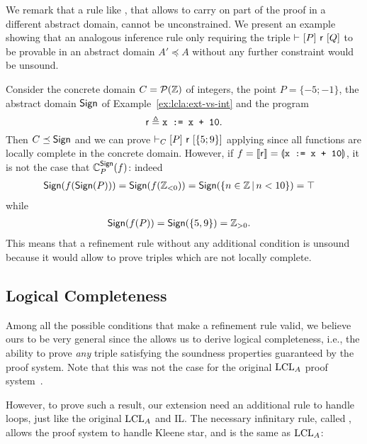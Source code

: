 We remark that a rule like , that allows to carry on part of the proof in a different abstract domain, cannot be unconstrained. We present an example showing that an analogous inference rule only requiring the triple $\vdash_{}\nobreak[P]~\mathsf{r}~[Q]$ to be provable in an abstract domain $A' \preceq A$ without any further constraint would be unsound.
\begin{example}
	Consider the concrete domain $C = \mathcal{P}(\mathbb{Z})$ of integers, the point $P = \{ -5; -1 \}$, the abstract domain $\mathsf{Sign}$ of Example~\ref{ex:lcla:ext-vs-int} and the program
	\[
	\mathsf{r} \triangleq \texttt{x := x + 10} .
	\]
	Then $C \preceq \mathsf{Sign}$ and we can prove $\vdash_{C}\nobreak[P]~\mathsf{r}~[\{ 5; 9 \}]$ applying  since all functions are locally complete in the concrete domain. However, if $f = \llbracket\mathsf{r}\rrbracket = \llparenthesis\texttt{x := x + 10}\rrparenthesis$, it is not the case that $\mathbb{C}^{\mathsf{Sign}}_{P}(f)$: indeed
	\begin{align*}
		\mathsf{Sign} (f (\mathsf{Sign}(P))) &= \mathsf{Sign} (f(\mathbb{Z}_{< 0})) = \mathsf{Sign}(\{ n \in \mathbb{Z} \,\vert\, n < 10 \}) = \top
	\end{align*}
	while
	\begin{align*}
		\mathsf{Sign}(f(P)) & = \mathsf{Sign}(\{ 5, 9 \}) = \mathbb{Z}_{> 0}.
	\end{align*}
	This means that a refinement rule without any additional condition is unsound because it would allow to prove triples which are not locally complete.
\end{example}

\subsection{Logical Completeness}\label{sec:logical-completeness}
Among all the possible conditions that make a refinement rule valid, we believe ours to be very general since the  allows us to derive logical completeness, i.e., the ability to prove \emph{any} triple satisfying the soundness properties guaranteed by the proof system. Note that this was not the case for the original $\text{LCL}_A$ proof system~\cite[§5.2]{BGGR21}.

However, to prove such a result, our extension need an additional rule to handle loops, just like the original $\text{LCL}_A$ and IL.
The necessary infinitary rule, called , allows the proof system to handle Kleene star, and is the same as $\text{LCL}_A$:

